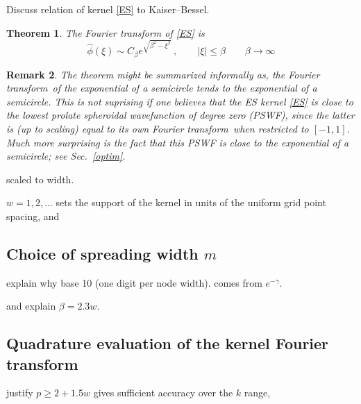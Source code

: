 \documentclass[10pt]{article}
\newcommand{\be}{\begin{equation}}
\newcommand{\ee}{\end{equation}}
\newtheorem{thm}{Theorem}
\newtheorem{rmk}[thm]{Remark}
\newcommand{\freq}{\beta}          %
\newcommand{\KB}{Kaiser--Bessel}
\newcommand{\FT}{Fourier transform}
\begin{document}
Discuss relation of kernel \eqref{ES} to \KB.


\begin{thm} %
  
The Fourier transform of \eqref{ES} is
\be
\hat\phi(\xi) \sim C_\freq e^{\sqrt{\freq^2-\xi^2}}
~, \qquad |\xi| \le \freq
\qquad  \freq\to\infty
\label{EShat}
\ee

\end{thm} %



\begin{rmk}
  The theorem might be summarized informally as,
  {\em the \FT\ of the exponential
    of a semicircle tends to the exponential of a semicircle}.
  This is not suprising
  if one believes that the ES kernel \eqref{ES} is close
  to the lowest prolate spheroidal wavefunction of degree zero (PSWF),
  since the latter is (up to scaling)
  equal to its own \FT\ when restricted to $[-1,1]$.
  Much more surprising is the fact that this PSWF is close to the exponential
  of a semicircle; see Sec.~\ref{optim}.
%
\end{rmk}  

scaled to width.

$w=1,2,\ldots$
sets the support of the kernel in units of the uniform grid point spacing, and


\subsection{Choice of spreading width $m$}
\label{s:w}

explain why base 10 (one digit per node width).
comes from $e^{-\gamma}$.

and explain $\beta = 2.3 w$.


\subsection{Quadrature evaluation of the kernel Fourier transform}
\label{s:p}

justify  $p\ge 2+1.5 w$ gives sufficient accuracy
over the $k$ range,
\end{document}

